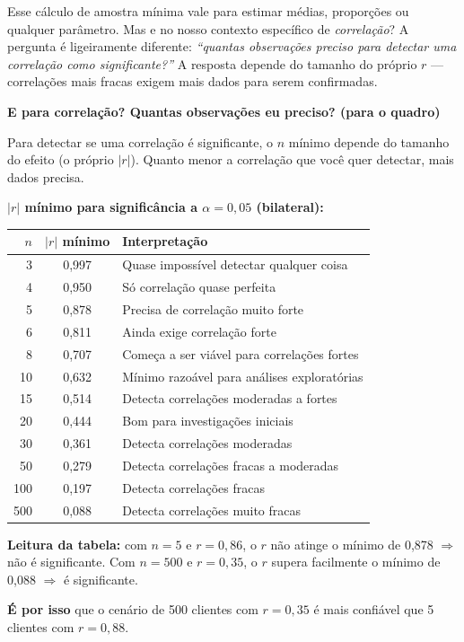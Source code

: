 Esse cálculo de amostra mínima vale para estimar médias, proporções
ou qualquer parâmetro.
Mas e no nosso contexto específico de \emph{correlação}?
A pergunta é ligeiramente diferente: \textit{``quantas observações preciso
para detectar uma correlação como significante?''}
A resposta depende do tamanho do próprio $r$ — correlações mais fracas
exigem mais dados para serem confirmadas.

\begin{BoardBox}
\textbf{E para correlação? Quantas observações eu preciso? (para o quadro)}

Para detectar se uma correlação é significante, o $n$ mínimo depende
do tamanho do efeito (o próprio $|r|$). Quanto menor a correlação que
você quer detectar, mais dados precisa.

\textbf{$|r|$ mínimo para significância a $\alpha = 0{,}05$ (bilateral):}

\medskip
\begin{tabular}{|r|c|l|}
\hline
\textbf{$n$} & \textbf{$|r|$ mínimo} & \textbf{Interpretação} \\
\hline
3  & 0,997 & Quase impossível detectar qualquer coisa \\
4  & 0,950 & Só correlação quase perfeita \\
5  & 0,878 & Precisa de correlação muito forte \\
6  & 0,811 & Ainda exige correlação forte \\
8  & 0,707 & Começa a ser viável para correlações fortes \\
10 & 0,632 & Mínimo razoável para análises exploratórias \\
15 & 0,514 & Detecta correlações moderadas a fortes \\
20 & 0,444 & Bom para investigações iniciais \\
30 & 0,361 & Detecta correlações moderadas \\
50 & 0,279 & Detecta correlações fracas a moderadas \\
100 & 0,197 & Detecta correlações fracas \\
500 & 0,088 & Detecta correlações muito fracas \\
\hline
\end{tabular}

\medskip
\textbf{Leitura da tabela:} com $n = 5$ e $r = 0{,}86$, o $r$ não
atinge o mínimo de 0,878 $\Rightarrow$ não é significante.
Com $n = 500$ e $r = 0{,}35$, o $r$ supera facilmente o
mínimo de 0,088 $\Rightarrow$ é significante.

\textbf{É por isso} que o cenário de 500 clientes com $r = 0{,}35$ é
mais confiável que 5 clientes com $r = 0{,}88$.
\end{BoardBox}

